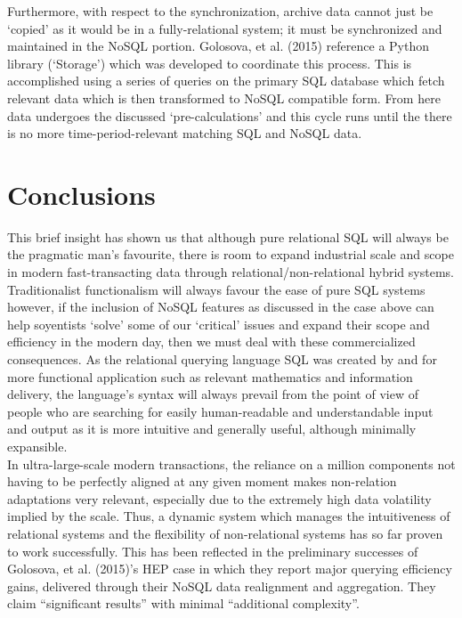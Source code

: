 \documentclass[11pt, english]{article}
\begin{document}
	Furthermore, with respect to the synchronization, archive data cannot just be `copied' as it would be in a fully-relational system; it must be synchronized and maintained in the NoSQL portion. Golosova, et al. (2015) reference a Python library (`Storage') which was developed to coordinate this process. This is accomplished using a series of queries on the primary SQL database which fetch relevant data which is then transformed to NoSQL compatible form. From here data undergoes the discussed `pre-calculations' and this cycle runs until the there is no more time-period-relevant matching SQL and NoSQL data.

\section{Conclusions}

	This brief insight has shown us that although pure relational SQL will always be the pragmatic man's favourite, there is room to expand industrial scale and scope in modern fast-transacting data through relational/non-relational hybrid systems. Traditionalist functionalism will always favour the ease of pure SQL systems however, if the inclusion of NoSQL features as discussed in the case above can help soyentists `solve' some of our `critical' issues and expand their scope and efficiency in the modern day, then we must deal with these commercialized consequences. As the relational querying language SQL was created by and for more functional application such as relevant mathematics and information delivery, the language's syntax will always prevail from the point of view of people who are searching for easily human-readable and understandable input and output as it is more intuitive and generally useful, although minimally expansible.\\

	In ultra-large-scale modern transactions, the reliance on a million components not having to be perfectly aligned at any given moment makes non-relation adaptations very relevant, especially due to the extremely high data volatility implied by the scale. Thus, a dynamic system which manages the intuitiveness of relational systems and the flexibility of non-relational systems has so far proven to work successfully. This has been reflected in the preliminary successes of Golosova, et al. (2015)'s HEP case in which they report major querying efficiency gains, delivered through their NoSQL data realignment and aggregation. They claim ``significant results'' with minimal ``additional complexity''.\\
\end{document}
